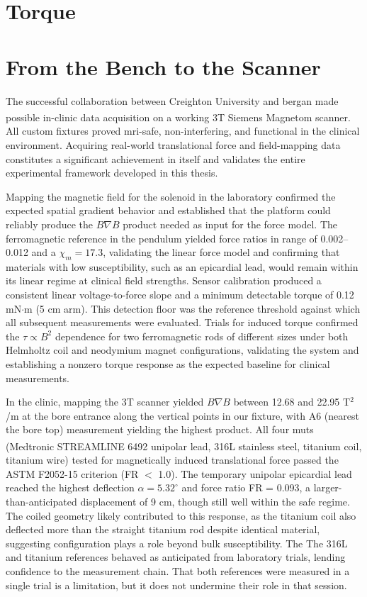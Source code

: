 \section{Torque} 
\label{sec:resTorque}


\section{From the Bench to the Scanner}

The successful collaboration between Creighton University and \gls{bergan} made possible in-clinic data acquisition on a working 3T Siemens Magnetom\textsuperscript{\texttrademark} scanner. All custom fixtures proved \gls{mri}-safe, non-interfering, and functional in the clinical environment. Acquiring real-world translational force and field-mapping data constitutes a significant achievement in itself and validates the entire experimental framework developed in this thesis.

Mapping the magnetic field for the solenoid in the laboratory confirmed the expected spatial gradient behavior and established that the platform could reliably produce the $B \nabla B$ product needed as input for the force model. The ferromagnetic reference in the pendulum yielded force ratios in range of 0.002–0.012 and a $\chi_m = 17.3$, validating the linear force model and confirming that materials with low susceptibility, such as an epicardial lead, would remain within its linear regime at clinical field strengths. Sensor calibration produced a consistent linear voltage-to-force slope and a minimum detectable torque of 0.12 mN$\cdot$m (5 cm arm). This detection floor was the reference threshold against which all subsequent measurements were evaluated. Trials for induced torque confirmed the $\tau \propto B^2$ dependence for two ferromagnetic rods of different sizes under both Helmholtz coil and neodymium magnet configurations, validating the system and establishing a nonzero torque response as the expected baseline for clinical measurements. 

 In the clinic, mapping the 3T scanner yielded $B \nabla B$ between 12.68 and 22.95 T$^2$/m at the bore entrance along the vertical points in our fixture, with A6 (nearest the bore top) measurement yielding the highest product. All four \glspl{mut} (Medtronic STREAMLINE\textsuperscript{\texttrademark} 6492 unipolar lead, 316L stainless steel, titanium coil, titanium wire) tested for magnetically induced translational force passed the ASTM F2052-15 criterion (FR $<$ 1.0). The temporary unipolar epicardial lead reached the highest deflection $\alpha = 5.32 ^\circ$ and force ratio FR = 0.093, a larger-than-anticipated displacement of 9 cm, though still well within the safe regime. The coiled geometry likely contributed to this response, as the titanium coil also deflected more than the straight titanium rod despite identical material, suggesting configuration plays a role beyond bulk susceptibility. The The 316L and titanium references behaved as anticipated from laboratory trials, lending confidence to the measurement chain. That both references were measured in a single trial is a limitation, but it does not undermine their role in that session. 
 
